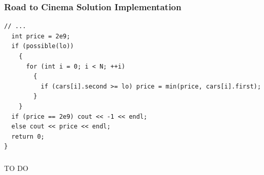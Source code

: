 \documentclass{beamer}
\newcounter{exo}
\newcommand{\exo}{
  \addtocounter{exo}{1}
  Exercice \arabic{exo}
}
\begin{document}
\begin{frame}[containsverbatim]
\frametitle{Road to Cinema Solution Implementation}
\scriptsize

\begin{lstlisting}[mathescape]
  // ...
  int price = 2e9;
  if (possible(lo))
    {
      for (int i = 0; i < N; ++i)
        {
          if (cars[i].second >= lo) price = min(price, cars[i].first);
        }
    }
  if (price == 2e9) cout << -1 << endl;
  else cout << price << endl;
  return 0;
}
\end{lstlisting}

\end{frame}

\fi


\ifanswers

\begin{frame}%
\frametitle{}

TO DO

\end{frame}

\begin{frame}[containsverbatim]
\frametitle{}
\scriptsize

\begin{lstlisting}[mathescape]
\end{lstlisting}

\end{frame}

\begin{frame}[containsverbatim]
\frametitle{}
\scriptsize

\begin{lstlisting}[mathescape]
\end{lstlisting}

\end{frame}

\begin{frame}[containsverbatim]
\frametitle{}
\scriptsize

\begin{lstlisting}[mathescape]
\end{lstlisting}

\end{frame}
\end{document}
